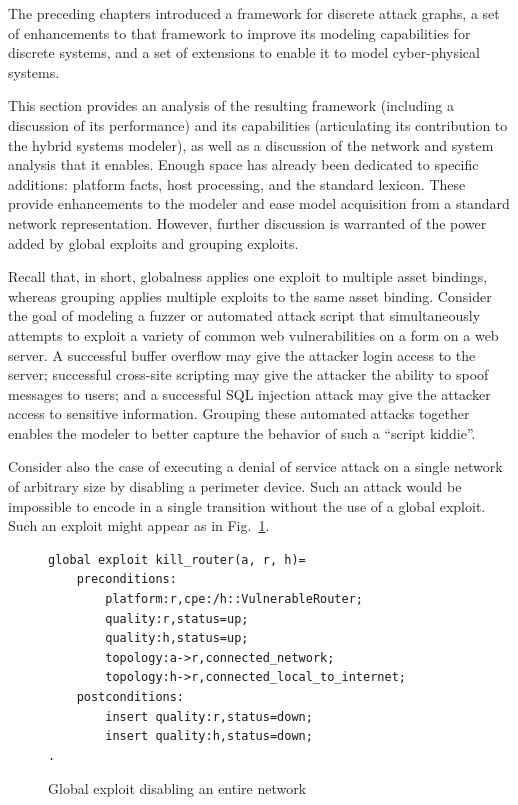 The preceding chapters introduced a framework for discrete attack graphs,
a set of enhancements to that framework to improve its modeling capabilities for
discrete systems, and a set of extensions to enable it to model cyber-physical
systems.

This section provides an analysis of the resulting framework (including
a discussion of its performance) and its capabilities (articulating its
contribution to the hybrid systems modeler), as well as a discussion of the
network and system analysis that it enables.
Enough space has already been dedicated to specific additions: platform
facts, host processing, and the standard lexicon. These provide enhancements
to the modeler and ease model acquisition from a standard network 
representation. However, further discussion is warranted of the power added
by global exploits and grouping exploits.

Recall that, in short, globalness applies one exploit to multiple asset 
bindings, whereas grouping applies multiple exploits to the same asset binding.
Consider the goal of modeling a fuzzer or automated attack script that
simultaneously attempts to exploit a variety of common web vulnerabilities on
a form on a web server. A successful buffer overflow may give the attacker
login access to the server; successful cross-site scripting may give the
attacker the ability to spoof messages to users; and a successful SQL injection
attack may give the attacker access to sensitive information. Grouping these
automated attacks together enables the modeler to better capture the behavior
of such a ``script kiddie''.

Consider also the case of executing a denial of service attack on a single
network of arbitrary size by disabling a perimeter device. Such an attack would
be impossible to encode in a single transition without the use of a global
exploit. Such an exploit might appear as in Fig.~\ref{fig:network_dos_global}.

\begin{figure}
\begin{lstlisting}
global exploit kill_router(a, r, h)=
    preconditions:
        platform:r,cpe:/h::VulnerableRouter;
        quality:r,status=up;
        quality:h,status=up;
        topology:a->r,connected_network;
        topology:h->r,connected_local_to_internet;
    postconditions:
        insert quality:r,status=down;
        insert quality:h,status=down;
.
\end{lstlisting}
\caption{Global exploit disabling an entire network}
\label{fig:network_dos_global}
\end{figure}

